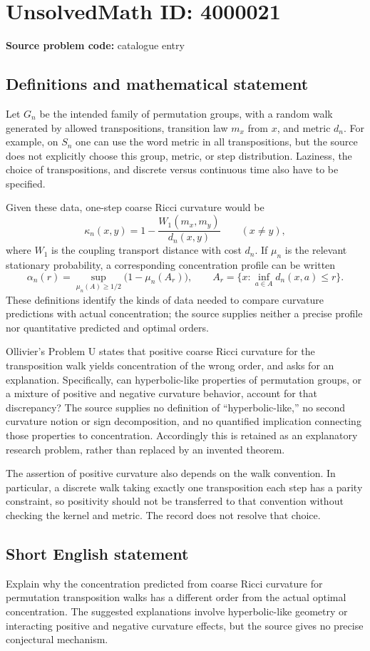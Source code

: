 \documentclass[11pt]{article}
\begin{document}
\section*{UnsolvedMath ID: 4000021}
\textbf{Source problem code:} catalogue entry
\subsection{Definitions and mathematical statement}
Let $G_n$ be the intended family of permutation groups, with a random walk generated by allowed transpositions, transition law $m_x$ from $x$, and metric $d_n$. For example, on $S_n$ one can use the word metric in all transpositions, but the source does not explicitly choose this group, metric, or step distribution. Laziness, the choice of transpositions, and discrete versus continuous time also have to be specified.

Given these data, one-step coarse Ricci curvature would be
\[
 \kappa_n(x,y)=1-\frac{W_1(m_x,m_y)}{d_n(x,y)}\qquad(x\ne y),
\]
where $W_1$ is the coupling transport distance with cost $d_n$. If $\mu_n$ is the relevant stationary probability, a corresponding concentration profile can be written
\[
 \alpha_n(r)=\sup_{\mu_n(A)\ge1/2}
       \bigl(1-\mu_n(A_r)\bigr),\qquad
 A_r=\{x:\inf_{a\in A}d_n(x,a)\le r\}.
\]
These definitions identify the kinds of data needed to compare curvature predictions with actual concentration; the source supplies neither a precise profile nor quantitative predicted and optimal orders.

Ollivier's Problem U states that positive coarse Ricci curvature for the transposition walk yields concentration of the wrong order, and asks for an explanation. Specifically, can hyperbolic-like properties of permutation groups, or a mixture of positive and negative curvature behavior, account for that discrepancy? The source supplies no definition of ``hyperbolic-like,'' no second curvature notion or sign decomposition, and no quantified implication connecting those properties to concentration. Accordingly this is retained as an explanatory research problem, rather than replaced by an invented theorem.

The assertion of positive curvature also depends on the walk convention. In particular, a discrete walk taking exactly one transposition each step has a parity constraint, so positivity should not be transferred to that convention without checking the kernel and metric. The record does not resolve that choice.
\subsection{Short English statement}
Explain why the concentration predicted from coarse Ricci curvature for permutation transposition walks has a different order from the actual optimal concentration. The suggested explanations involve hyperbolic-like geometry or interacting positive and negative curvature effects, but the source gives no precise conjectural mechanism.
\end{document}
